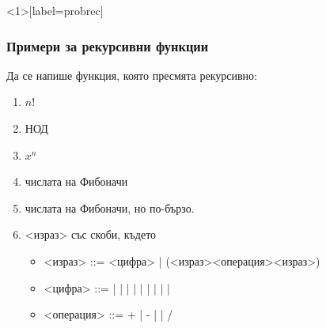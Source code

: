 \documentclass[alsotrans]{beamerswitch}
\begin{document}
\begin{frame}<1>[label=probrec]
  \frametitle{Примери за рекурсивни функции}

  Да се напише функция, която пресмята рекурсивно:
  \begin{enumerate}[<+->]
  \item $n!$
  \item НОД
  \item $x^n$
  \item числата на Фибоначи
  \item числата на Фибоначи, но \alert{по-бързо}.
  \item{} <израз> със скоби, където
    \begin{itemize}[<.->]
    \item{} <израз> ::= <цифра> | \tta(<израз><операция><израз>\tta)
    \item{} <цифра> ::=  |  |  |  |  |  |  |  |  | 
    \item{} <операция> ::= \tta+ | \tta- | \tta* | \tta/
    \end{itemize}
  \end{enumerate}
\end{frame}
\end{document}
